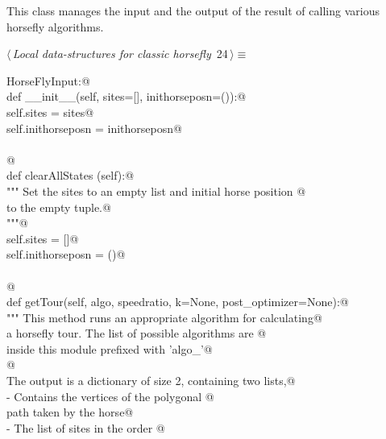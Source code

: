 \documentclass[11.5pt]{report}
\begin{document}
\newchunk This class manages the input and the output of the result of 
calling various horsefly algorithms. 

\begin{flushleft} \small\label{scrap18}\raggedright\small
{} $\langle\,${\itshape Local data-structures for classic horsefly}\nobreak\ {\footnotesize {24}}$\,\rangle\equiv$
\vspace{-1ex}
\begin{list}{}{} \item
\mbox{}\verb@class HorseFlyInput:@\\
\mbox{}\verb@      def __init__(self, sites=[], inithorseposn=()):@\\
\mbox{}\verb@           self.sites         = sites@\\
\mbox{}\verb@           self.inithorseposn = inithorseposn@\\
\mbox{}\verb@@\\
\mbox{}\verb@           @\\
\mbox{}\verb@      def clearAllStates (self):@\\
\mbox{}\verb@          """ Set the sites to an empty list and initial horse position @\\
\mbox{}\verb@          to the empty tuple.@\\
\mbox{}\verb@          """@\\
\mbox{}\verb@          self.sites = []@\\
\mbox{}\verb@          self.inithorseposn = ()@\\
\mbox{}\verb@@\\
\mbox{}\verb@          @\\
\mbox{}\verb@      def getTour(self, algo, speedratio, k=None, post_optimizer=None):@\\
\mbox{}\verb@          """ This method runs an appropriate algorithm for calculating@\\
\mbox{}\verb@          a horsefly tour. The list of possible algorithms are @\\
\mbox{}\verb@          inside this module prefixed with 'algo_'@\\
\mbox{}\verb@          @\\
\mbox{}\verb@          The output is a dictionary of size 2, containing two lists,@\\
\mbox{}\verb@          - Contains the vertices of the polygonal @\\
\mbox{}\verb@            path taken by the horse@\\
\mbox{}\verb@          - The list of sites in the order @\\

\end{list}
\end{flushleft}
\end{document}
